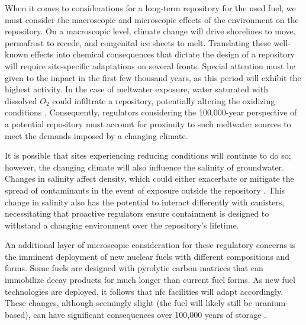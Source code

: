 When it comes to considerations for a long-term repository for the used fuel,
we must consider the macroscopic and microscopic effects of the environment on
the repository. On a macroscopic level, climate change will drive shorelines to
move, permafrost to recede, and congenital ice sheets to melt. Translating
these well-known effects into chemical consequences that dictate the design of
a repository will require site-specific adaptations on several fronts. Special
attention must be given to the impact in the first few thousand years, as this
period will exhibit the highest activity. In the case of meltwater exposure,
water saturated with dissolved $O_2$ could infiltrate a repository,
potentially altering the oxidizing conditions \cite{gurban_hydrochemical_2001}.
Consequently, regulators considering the 100,000-year perspective of a
potential repository must account for proximity to such meltwater sources to
meet the demands imposed by a changing climate.

It is possible that sites experiencing reducing conditions will
continue to do so; however, the changing climate will also influence the
salinity of groundwater. Changes in salinity affect density, which could either
exacerbate or mitigate the spread of contaminants in the event of exposure
outside the repository \cite{gurban_hydrochemical_2001}. This change in
salinity also has the potential to interact differently with canisters,
necessitating that proactive regulators ensure containment is designed to
withstand a changing environment over the repository's lifetime.

An additional layer of microscopic consideration for these regulatory concerns
is the imminent deployment of new nuclear fuels with different compositions and
forms. Some fuels are designed with pyrolytic carbon matrices that can
immobilize decay products for much longer than current fuel forms. As new fuel
technologies are deployed, it follows that \gls{nfc} facilities will adapt
accordingly. These changes, although seemingly slight (the fuel will likely
still be uranium-based), can have significant consequences over 100,000 years
of storage \cite{hyland_post_closure_2013}.